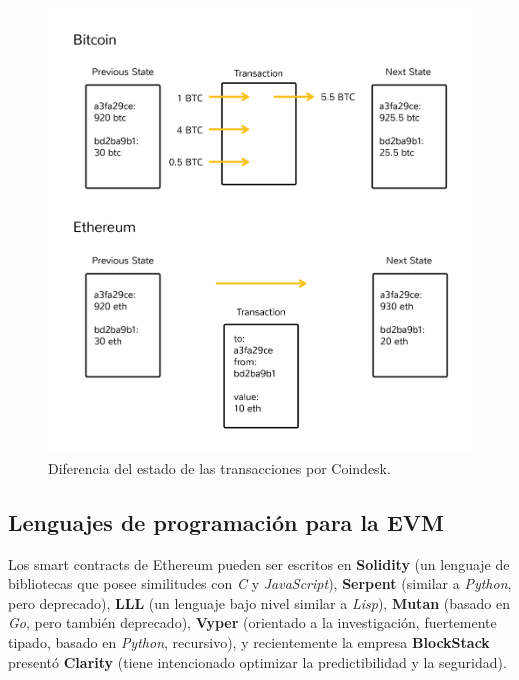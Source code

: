 \begin{figure}[ht]
    \centering
    \includegraphics[scale=0.5]{images/statecoindesk.png}
    \caption{Diferencia del estado de las transacciones por Coindesk.}
    \label{fig:ethereum state transaction}
\end{figure}


\subsection{Lenguajes de programación para la EVM}
Los smart contracts de Ethereum pueden ser escritos en \textbf{Solidity}\cite{soliditylink} (un lenguaje de bibliotecas que posee similitudes con \textit{C} y \textit{JavaScript}), \textbf{Serpent}\cite{serpentlink} (similar a \textit{Python}, pero deprecado), \textbf{LLL}\cite{llllink} (un lenguaje bajo nivel similar a \textit{Lisp}), \textbf{Mutan}\cite{mutanlink} (basado en \textit{Go}, pero también deprecado), \textbf{Vyper}\cite{vyperlink} (orientado a la investigación, fuertemente tipado, basado en \textit{Python}, recursivo), y recientemente la empresa \textbf{BlockStack}\cite{blockstacklink} presentó \textbf{Clarity}\cite{claritylink} (tiene intencionado optimizar la predictibilidad y la seguridad).\\

